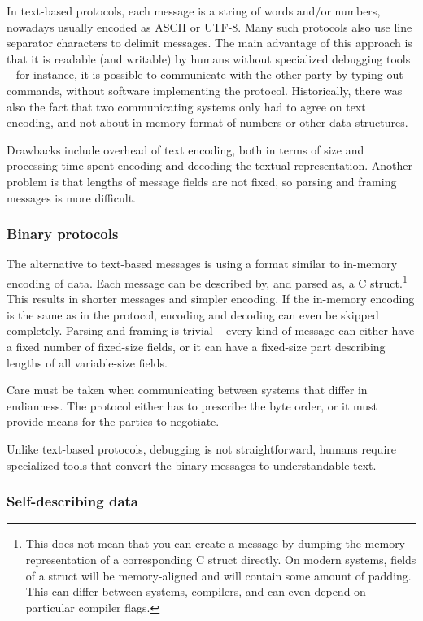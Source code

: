 In text-based protocols, each message is a string of words and/or numbers, nowadays usually encoded as ASCII
or UTF-8. Many such protocols also use line separator characters to delimit messages. The main advantage of
this approach is that it is readable (and writable) by humans without specialized debugging tools -- for
instance, it is possible to communicate with the other party by typing out commands, without software
implementing the protocol.  Historically, there was also the fact that two communicating systems only had to
agree on text encoding, and not about in-memory format of numbers or other data structures.

Drawbacks include overhead of text encoding, both in terms of size and processing time spent encoding and
decoding the textual representation. Another problem is that lengths of message fields are not fixed, so
parsing and framing messages is more difficult.

\subsubsection{Binary protocols}

The alternative to text-based messages is using a format similar to in-memory encoding of data. Each message
can be described by, and parsed as, a C struct.\footnote{This does not mean that you can create a message by
dumping the memory representation of a corresponding C struct directly. On modern systems, fields of a struct
will be memory-aligned and will contain some amount of padding. This can differ between systems, compilers,
and can even depend on particular compiler flags.} This results in shorter messages and simpler encoding. If
the in-memory encoding is the same as in the protocol, encoding and decoding can even be skipped completely.
Parsing and framing is trivial -- every kind of message can either have a fixed number of fixed-size fields, or
it can have a fixed-size part describing lengths of all variable-size fields.

Care must be taken when communicating between systems that differ in endianness.  The protocol either has to
prescribe the byte order, or it must provide means for the parties to negotiate.

Unlike text-based protocols, debugging is not straightforward, humans require specialized tools that convert
the binary messages to understandable text.

\subsubsection{Self-describing data}

